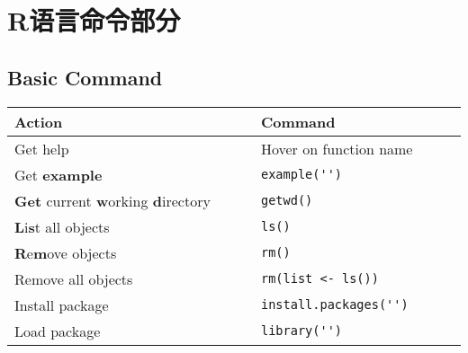 \section{R语言命令部分}


\subsection{Basic Command}

\begin{table}[htbp]
    \centering
    \renewcommand\arraystretch{0.9}
    \begin{tabular}{l|l}
        \hline
        Action$\qquad\qquad\qquad\qquad\qquad\qquad\qquad$&Command$\qquad\qquad\qquad\qquad\qquad$\\
        \hline
        Get help&Hover on function name\\
        Get \textbf{example}&\lstinline|example('')|\\
        \textbf{Get} current \textbf{w}orking \textbf{d}irectory&\lstinline|getwd()|\\
        \textbf{L}i\textbf{s}t all objects&\lstinline|ls()|\\
        \textbf{R}e\textbf{m}ove objects&\lstinline|rm()|\\
        Remove all objects&\lstinline|rm(list <- ls())|\\
        Install package&\lstinline|install.packages('')|\\
        Load package&\lstinline|library('')|\\
        \hline
    \end{tabular}
\end{table}

    

